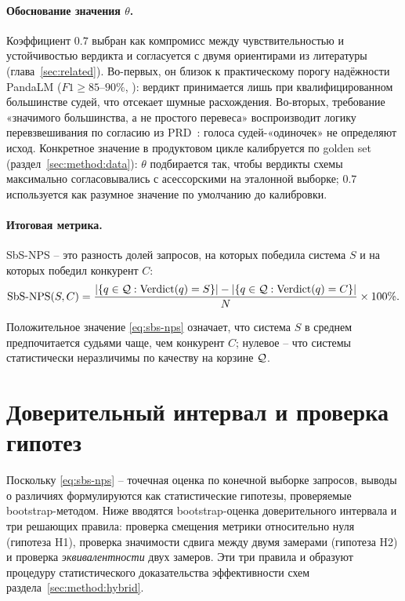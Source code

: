\paragraph{Обоснование значения $\theta$.}
Коэффициент $0.7$ выбран как компромисс между чувствительностью и
устойчивостью вердикта и согласуется с двумя ориентирами из литературы
(глава~\ref{sec:related}).
Во-первых, он близок к практическому порогу надёжности PandaLM
($F1 \ge 85$--$90\%$, \cite{wang2023pandalm}): вердикт принимается лишь
при квалифицированном большинстве судей, что отсекает шумные расхождения.
Во-вторых, требование «значимого большинства, а не простого перевеса»
воспроизводит логику перевзвешивания по согласию из PRD~\cite{li2023prd}:
голоса судей-«одиночек» не определяют исход.
Конкретное значение в продуктовом цикле калибруется по golden set
(раздел~\ref{sec:method:data}): $\theta$ подбирается так, чтобы вердикты
схемы максимально согласовывались с асессорскими на эталонной выборке;
$0.7$ используется как разумное значение по умолчанию до калибровки.

\paragraph{Итоговая метрика.}
SbS-NPS -- это разность долей запросов, на которых победила система $S$
и на которых победил конкурент $C$:
\begin{equation}
    \label{eq:sbs-nps}
    \mathrm{SbS\text{-}NPS}(S, C) =
        \frac{
            \left\lvert\{q \in \mathcal{Q} : \mathrm{Verdict}(q) = S\}\right\rvert
            -
            \left\lvert\{q \in \mathcal{Q} : \mathrm{Verdict}(q) = C\}\right\rvert
        }{N}
        \times 100\%.
\end{equation}

Положительное значение \eqref{eq:sbs-nps} означает, что система $S$
в среднем предпочитается судьями чаще, чем конкурент $C$; нулевое --
что системы статистически неразличимы по качеству на корзине $\mathcal{Q}$.

\section{Доверительный интервал и проверка гипотез}
\label{sec:method:bootstrap}

Поскольку \eqref{eq:sbs-nps} -- точечная оценка по конечной выборке
запросов, выводы о различиях формулируются как статистические гипотезы,
проверяемые bootstrap-методом.
Ниже вводятся bootstrap-оценка доверительного интервала и три решающих
правила: проверка смещения метрики относительно нуля (гипотеза H1),
проверка значимости сдвига между двумя замерами (гипотеза H2) и проверка
\emph{эквивалентности} двух замеров. Эти три правила и образуют процедуру
статистического доказательства эффективности схем
раздела~\ref{sec:method:hybrid}.

